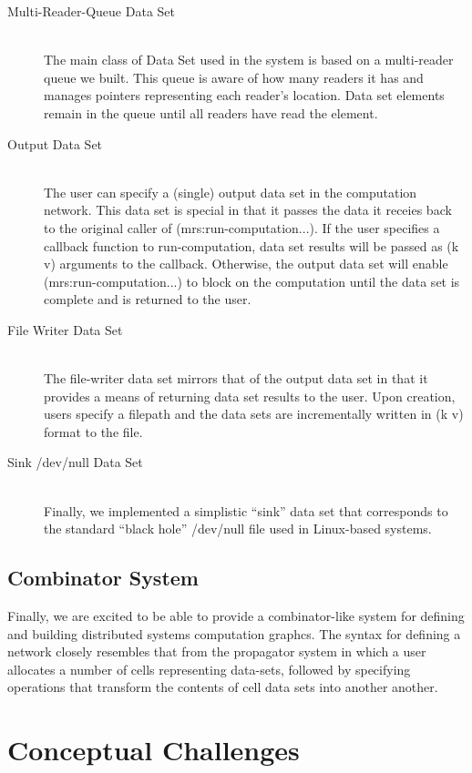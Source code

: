 \documentclass{article}
\begin{document}
\begin{description}

\item[Multi-Reader-Queue Data Set] \hfill \\
The main class of Data Set used in the system is based on a
multi-reader queue we built. This queue is aware of how many readers
it has and manages pointers representing each reader's location. Data
set elements remain in the queue until all readers have read the
element. 

\item[Output Data Set] \hfill \\
The user can specify a (single) output data set in the computation
network. This data set is special in that it passes the data it
receies back to the original caller of (mrs:run-computation...). If
the user specifies a callback function to run-computation, data set
results will be passed as (k v) arguments to the callback. Otherwise,
the output data set will enable (mrs:run-computation...) to block on
the computation until the data set is complete and is returned to the user.

\item[File Writer Data Set] \hfill \\
The file-writer data set mirrors that of the output data set in that
it provides a means of returning data set results to the user. Upon
creation, users specify a filepath and the data sets are incrementally
written in (k v) format to the file.

\item[Sink /dev/null Data Set] \hfill \\
Finally, we implemented a simplistic ``sink'' data set that
corresponds to the standard ``black hole'' /dev/null file used in
Linux-based systems.
\end{description}
\subsection{Combinator System}

Finally, we are excited to be able to provide a combinator-like system
for defining and building distributed systems computation graphcs. The
syntax for defining a network closely resembles that from the
propagator system in which a user allocates a number of cells
representing data-sets, followed by specifying operations that
transform the contents of cell data sets into another another.

\section{Conceptual Challenges}
\end{document}
